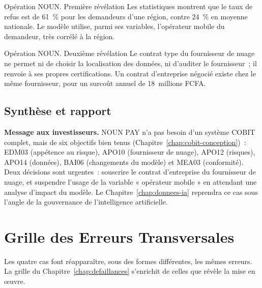 \begin{boxscenario}{Opération NOUN. Première révélation}
Les statistiques montrent que le taux de refus est de 61~\% pour les
demandeurs d'une région, contre 24~\% en moyenne nationale. Le modèle
utilise, parmi ses variables, l'opérateur mobile du demandeur, très
corrélé à la région.
\end{boxscenario}

\begin{boxscenario}{Opération NOUN. Deuxième révélation}
Le contrat type du fournisseur de nuage ne permet ni de choisir la
localisation des données, ni d'auditer le fournisseur~; il renvoie à ses
propres certifications. Un contrat d'entreprise négocié existe chez le
même fournisseur, pour un surcoût annuel de 18~millions FCFA.
\end{boxscenario}

\subsection{Synthèse et rapport}

\textbf{Message aux investisseurs.} NOUN PAY n'a pas besoin d'un système
COBIT complet, mais de six objectifs bien tenus (Chapitre~\ref{chap:cobit-conception})~:
EDM03 (appétence au risque), APO10 (fournisseur de nuage), APO12
(risques), APO14 (données), BAI06 (changements du modèle) et MEA03
(conformité). Deux décisions sont urgentes~: souscrire le contrat
d'entreprise du fournisseur de nuage, et suspendre l'usage de la variable
« opérateur mobile » en attendant une analyse d'impact du modèle. Le
Chapitre~\ref{chap:donnees-ia} reprendra ce cas sous l'angle de la
gouvernance de l'intelligence artificielle.

\section{Grille des Erreurs Transversales}
\label{sec:c17-erreurs}

Les quatre cas font réapparaître, sous des formes différentes, les mêmes
erreurs. La grille du Chapitre~\ref{chap:defaillances} s'enrichit de
celles que révèle la mise en œuvre.

